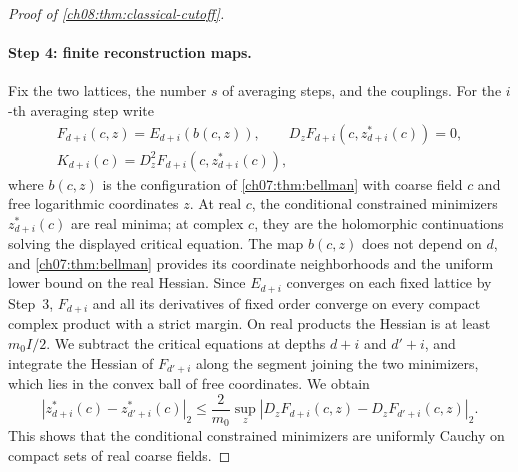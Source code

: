 \begin{proof}[Proof of \cref{ch08:thm:classical-cutoff}]
\paragraph{Step 4: finite reconstruction maps.}
Fix the two lattices, the number $s$ of averaging steps, and the couplings. For the $i$-th averaging step write
\[
 \begin{gathered}
 F_{d+i}(c,z)=E_{d+i}(b(c,z)),\qquad
 D_zF_{d+i}(c,z_{d+i}^*(c))=0,\\
 K_{d+i}(c)=D_z^2F_{d+i}(c,z_{d+i}^*(c)),
 \end{gathered}
\]
where $b(c,z)$ is the configuration of \cref{ch07:thm:bellman} with coarse field $c$ and free logarithmic coordinates $z$. At real $c$, the conditional constrained minimizers $z^*_{d+i}(c)$ are real minima; at complex $c$, they are the holomorphic continuations solving the displayed critical equation. The map $b(c,z)$ does not depend on $d$, and \cref{ch07:thm:bellman} provides its coordinate neighborhoods and the uniform lower bound on the real Hessian. Since $E_{d+i}$ converges on each fixed lattice by Step~3, $F_{d+i}$ and all its derivatives of fixed order converge on every compact complex product with a strict margin. On real products the Hessian is at least $m_0I/2$. We subtract the critical equations at depths $d+i$ and $d'+i$, and integrate the Hessian of $F_{d'+i}$ along the segment joining the two minimizers, which lies in the convex ball of free coordinates. We obtain
\[
 |z_{d+i}^*(c)-z_{d'+i}^*(c)|_2
 \le\frac2{m_0}\sup_z
       |D_zF_{d+i}(c,z)-D_zF_{d'+i}(c,z)|_2.
\]
This shows that the conditional constrained minimizers are uniformly Cauchy on compact sets of real coarse fields.


\end{proof}
